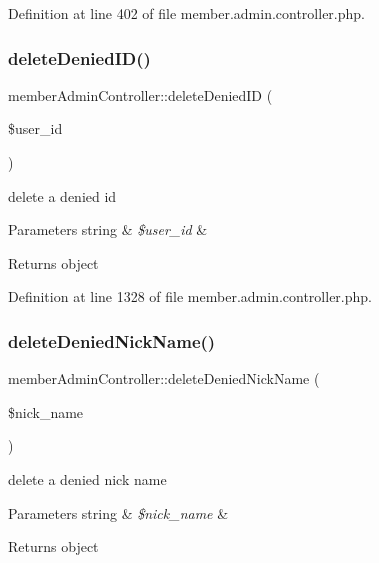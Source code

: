 Definition at line 402 of file member.\+admin.\+controller.\+php.

\hypertarget{classmemberAdminController_af7f02615adb1cbd7b8b91a330bda1a38}{}\label{classmemberAdminController_af7f02615adb1cbd7b8b91a330bda1a38} 
\subsubsection{\texorpdfstring{delete\+Denied\+I\+D()}{deleteDeniedID()}}
{\footnotesize\ttfamily member\+Admin\+Controller\+::delete\+Denied\+ID (\begin{DoxyParamCaption}\item[{}]{\$user\+\_\+id }\end{DoxyParamCaption})}

delete a denied id 
\begin{DoxyParams}[1]{Parameters}
string & {\em \$user\+\_\+id} & \\
\hline
\end{DoxyParams}
\begin{DoxyReturn}{Returns}
object 
\end{DoxyReturn}


Definition at line 1328 of file member.\+admin.\+controller.\+php.

\hypertarget{classmemberAdminController_a20792ed4ccef3abf09eb3fbd5dd955fb}{}\label{classmemberAdminController_a20792ed4ccef3abf09eb3fbd5dd955fb} 
\subsubsection{\texorpdfstring{delete\+Denied\+Nick\+Name()}{deleteDeniedNickName()}}
{\footnotesize\ttfamily member\+Admin\+Controller\+::delete\+Denied\+Nick\+Name (\begin{DoxyParamCaption}\item[{}]{\$nick\+\_\+name }\end{DoxyParamCaption})}

delete a denied nick name 
\begin{DoxyParams}[1]{Parameters}
string & {\em \$nick\+\_\+name} & \\
\hline
\end{DoxyParams}
\begin{DoxyReturn}{Returns}
object 
\end{DoxyReturn}


